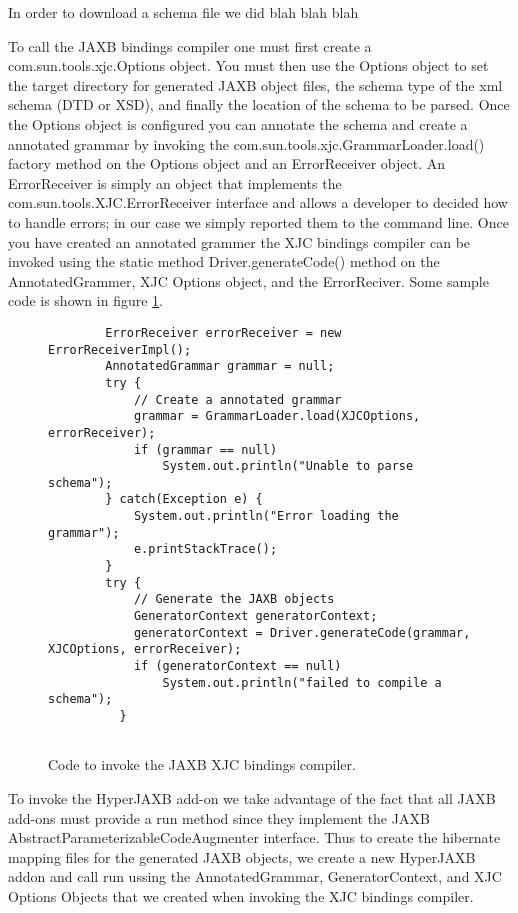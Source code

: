In order to download a schema file we did blah blah blah 

To call the JAXB bindings compiler one must first create a com.sun.tools.xjc.Options object.  You must then use the Options object to set the target directory for generated JAXB object files, the schema type of the xml schema (DTD or XSD), and finally the location of the schema to be parsed.  Once the Options object is configured you can annotate the schema and create a annotated grammar by invoking the com.sun.tools.xjc.GrammarLoader.load()  factory method on the Options object and an ErrorReceiver object.  An ErrorReceiver is simply an object that implements the com.sun.tools.XJC.ErrorReceiver interface and allows a developer to decided how to handle errors;  in our case we simply reported them to the command line.   Once you have created an annotated grammer the XJC bindings compiler can be invoked using the static method Driver.generateCode() method on the AnnotatedGrammer, XJC Options object, and the ErrorReciver.  Some sample code is shown in figure \ref{XJCsamplecode}.
\begin{figure}[htbp]
\begin{center}
\begin{verbatim}     
        ErrorReceiver errorReceiver = new ErrorReceiverImpl();
        AnnotatedGrammar grammar = null;
        try {
            // Create a annotated grammar
            grammar = GrammarLoader.load(XJCOptions, errorReceiver);
            if (grammar == null)
                System.out.println("Unable to parse schema");
        } catch(Exception e) {
            System.out.println("Error loading the grammar");
            e.printStackTrace(); 
        }
        try {
            // Generate the JAXB objects
            GeneratorContext generatorContext;
            generatorContext = Driver.generateCode(grammar, XJCOptions, errorReceiver);
            if (generatorContext == null)
                System.out.println("failed to compile a schema");
          }
        
\end{verbatim}

\caption{Code to invoke the JAXB XJC bindings compiler.}
\label{XJCsamplecode}
\end{center}
\end{figure}

To invoke the HyperJAXB add-on we take advantage of the fact that all JAXB add-ons must provide a run method since they implement the JAXB AbstractParameterizableCodeAugmenter interface.  Thus to create the hibernate mapping files for the generated JAXB objects, we create a new HyperJAXB addon and call run ussing the AnnotatedGrammar, GeneratorContext,  and XJC Options Objects that we created when invoking the XJC bindings compiler. 

